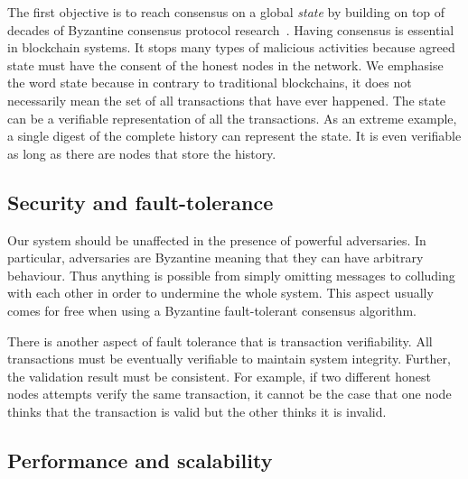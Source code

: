 The first objective is to reach consensus on a global \emph{state} by building on top of decades of Byzantine consensus protocol research~\cite{pease1980reaching, lamport1982byzantine, castro1999practical, miller2016honey}.
Having consensus is essential in blockchain systems.
It stops many types of malicious activities because agreed state must have the consent of the honest nodes in the network.
We emphasise the word state because in contrary to traditional blockchains,
it does not necessarily mean the set of all transactions that have ever happened.
The state can be a verifiable representation of all the transactions.
As an extreme example, a single digest of the complete history can represent the state.
It is even verifiable as long as there are nodes that store the history.


\subsection{Security and fault-tolerance}

Our system should be unaffected in the presence of powerful adversaries.
In particular, adversaries are Byzantine meaning that they can have arbitrary behaviour.
Thus anything is possible from simply omitting messages to colluding with each other in order to undermine the whole system.
This aspect usually comes for free when using a Byzantine fault-tolerant consensus algorithm.

There is another aspect of fault tolerance that is transaction verifiability.
All transactions must be eventually verifiable to maintain system integrity.
Further, the validation result must be consistent.
For example, if two different honest nodes attempts verify the same transaction,
it cannot be the case that one node thinks that the transaction is valid but the other thinks it is invalid.


\subsection{Performance and scalability}

